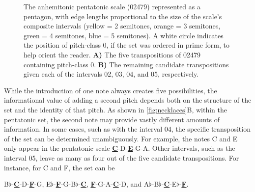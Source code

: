 \documentclass[10pt,twocolumn]{article}
\numberwithin{equation}{section} %
\begin{document}
    \begin{figure}[htbp]
        \centering
        \caption{The anhemitonic pentatonic scale (02479) represented as a pentagon, with edge lengths proportional to the size of the scale's composite intervals (yellow = 2 semitones, orange = 3 semitones, green = 4 semitones, blue = 5 semitones).
        A white circle indicates the position of pitch‑class 0, if the set was ordered in prime form, to help orient the reader.
        \textbf{A)} The five transpositions of 02479 containing pitch‑class 0.
        \textbf{B)} The remaining candidate transpositions given each of the intervals 02, 03, 04, and 05, respectively.}
        \label{fig:necklaces}
    \end{figure}

    While the introduction of one note always creates five possibilities, the informational value of adding a second pitch depends both on the structure of the set and the identity of that pitch.
    As shown in \autoref{fig:necklaces}B, within the pentatonic set, the second note may provide vastly different amounts of information.
    In some cases, such as with the interval 04, the specific transposition of the set can be determined unambiguously.
    For example, the notes C and E only appear in the pentatonic scale \textbf{\uline{C}}-D-\textbf{\uline{E}}-G-A.
    Other intervals, such as the interval 05, leave as many as four out of the five candidate transpositions.
    For instance, for C and F, the set can be

    B$\flat$-\textbf{\underline{C}}-D-\textbf{\underline{F}}-G,\qquad
    E$\flat$-\textbf{\underline{F}}-G-B$\flat$-\textbf{\underline{C}},\qquad
    \textbf{\underline{F}}-G-A-\textbf{\underline{C}}-D,\qquad
    and\qquad
    A$\flat$-B$\flat$-\textbf{\underline{C}}-E$\flat$-\textbf{\underline{F}}.
\end{document}
